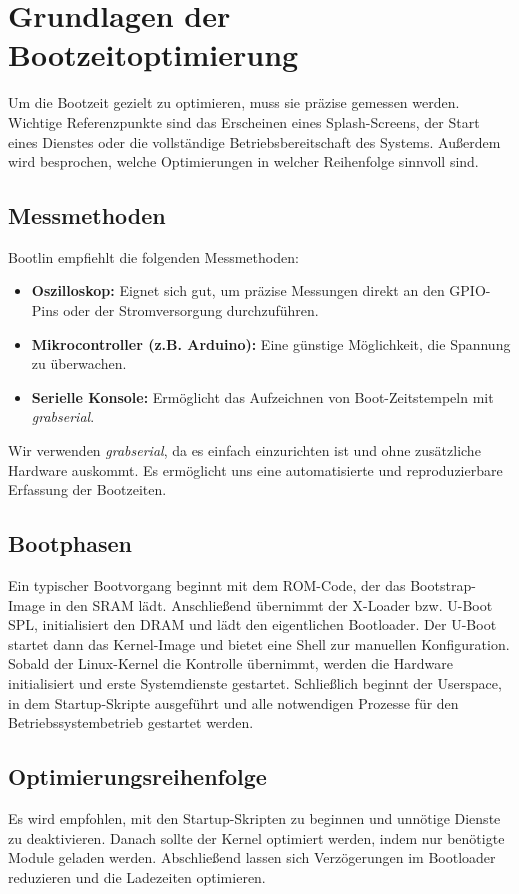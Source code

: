 
\section{Grundlagen der Bootzeitoptimierung}
Um die Bootzeit gezielt zu optimieren, muss sie präzise gemessen werden. Wichtige Referenzpunkte sind das Erscheinen eines Splash-Screens, der Start eines Dienstes oder die vollständige Betriebsbereitschaft des Systems. Außerdem wird besprochen, welche Optimierungen in welcher Reihenfolge sinnvoll sind.

\subsection{Messmethoden}
Bootlin empfiehlt die folgenden Messmethoden:
\begin{itemize}
	\item \textbf{Oszilloskop:} Eignet sich gut, um präzise Messungen direkt an den GPIO-Pins oder der Stromversorgung durchzuführen.
	\item \textbf{Mikrocontroller (z.B. Arduino):} Eine günstige Möglichkeit, die Spannung zu überwachen.
	\item \textbf{Serielle Konsole:} Ermöglicht das Aufzeichnen von Boot-Zeitstempeln mit \textit{grabserial}.
\end{itemize}

Wir verwenden \textit{grabserial}, da es einfach einzurichten ist und ohne zusätzliche Hardware auskommt. Es ermöglicht uns eine automatisierte und reproduzierbare Erfassung der Bootzeiten.

\subsection{Bootphasen}
Ein typischer Bootvorgang beginnt mit dem ROM-Code, der das Bootstrap-Image in den SRAM lädt. Anschließend übernimmt der X-Loader bzw. U-Boot SPL, initialisiert den DRAM und lädt den eigentlichen Bootloader. Der U-Boot startet dann das Kernel-Image und bietet eine Shell zur manuellen Konfiguration. Sobald der Linux-Kernel die Kontrolle übernimmt, werden die Hardware initialisiert und erste Systemdienste gestartet. Schließlich beginnt der Userspace, in dem Startup-Skripte ausgeführt und alle notwendigen Prozesse für den Betriebssystembetrieb gestartet werden.

\subsection{Optimierungsreihenfolge}
Es wird empfohlen, mit den Startup-Skripten zu beginnen und unnötige Dienste zu deaktivieren. Danach sollte der Kernel optimiert werden, indem nur benötigte Module geladen werden. Abschließend lassen sich Verzögerungen im Bootloader reduzieren und die Ladezeiten optimieren.
